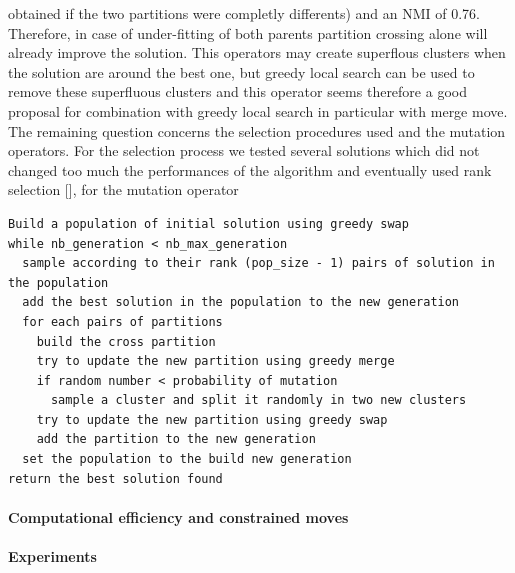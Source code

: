 \documentclass[]{article}
\let\oldparagraph\paragraph
\renewcommand{\paragraph}[1]{\oldparagraph{#1}\mbox{}}
\begin{document}
obtained if the two partitions were completly differents) and an NMI of
0.76. Therefore, in case of under-fitting of both parents partition
crossing alone will already improve the solution. This operators may
create superflous clusters when the solution are around the best one,
but greedy local search can be used to remove these superfluous clusters
and this operator seems therefore a good proposal for combination with
greedy local search in particular with merge move. The remaining
question concerns the selection procedures used and the mutation
operators. For the selection process we tested several solutions which
did not changed too much the performances of the algorithm and
eventually used rank selection {[}{]}, for the mutation operator

\begin{verbatim}
Build a population of initial solution using greedy swap
while nb_generation < nb_max_generation 
  sample according to their rank (pop_size - 1) pairs of solution in the population 
  add the best solution in the population to the new generation
  for each pairs of partitions
    build the cross partition
    try to update the new partition using greedy merge
    if random number < probability of mutation
      sample a cluster and split it randomly in two new clusters
    try to update the new partition using greedy swap
    add the partition to the new generation
  set the population to the build new generation
return the best solution found
\end{verbatim}

\paragraph{Computational efficiency and constrained
moves}\label{computational-efficiency-and-constrained-moves}

\paragraph{Experiments}\label{experiments}
\end{document}
